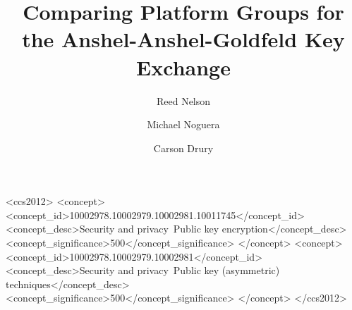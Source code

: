 \documentclass[sigconf,nonacm]{acmart}
\begin{document}
\fancyhead{}
\def\thetitle{Comparing Platform Groups for the Anshel-Anshel-Goldfeld Key Exchange}
\title{\thetitle}

\author{Reed Nelson}

\author{Michael Noguera}

\author{Carson Drury}

\date{}

\begin{CCSXML}
<ccs2012>
   <concept>
       <concept_id>10002978.10002979.10002981.10011745</concept_id>
       <concept_desc>Security and privacy~Public key encryption</concept_desc>
       <concept_significance>500</concept_significance>
       </concept>
   <concept>
       <concept_id>10002978.10002979.10002981</concept_id>
       <concept_desc>Security and privacy~Public key (asymmetric) techniques</concept_desc>
       <concept_significance>500</concept_significance>
       </concept>
 </ccs2012>
\end{CCSXML}



\maketitle
\keywords{}









\end{document}
